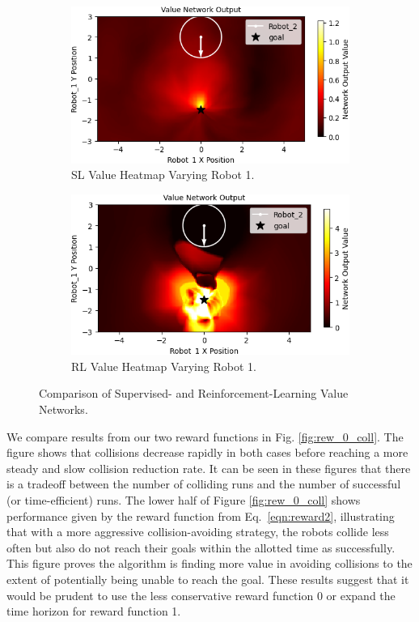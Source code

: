 \documentclass[conference]{IEEEtran}
\begin{document}
\begin{figure}[t!]
    \centering
    \begin{subfigure}[b]{0.49\textwidth}
         \centering
         \includegraphics[width=\textwidth]{docs/latex/figures/heatmap_1_Robot_1.png}
         \caption{SL Value Heatmap Varying Robot 1.}
         \label{fig:heatmap_21}
     \end{subfigure}
     \hfill
     \begin{subfigure}[b]{0.49\textwidth}
         \centering
         \includegraphics[width=\textwidth]{docs/latex/figures/heatmap_rl_robot1.png}
         \caption{RL Value Heatmap Varying Robot 1.}
         \label{fig:heatmap_22}
     \end{subfigure}
     \caption{Comparison of Supervised- and Reinforcement-Learning Value Networks.}\label{fig:heatmap_2}
\end{figure}

We compare results from our two reward functions in Fig. \ref{fig:rew_0_coll}. The figure shows that collisions decrease rapidly in both cases before reaching a more steady and slow collision reduction rate. It can be seen in these figures that there is a tradeoff between the number of colliding runs and the number of successful (or time-efficient) runs. The lower half of Figure \ref{fig:rew_0_coll} shows performance given by the reward function from Eq.~\ref{eqn:reward2}, illustrating that with a more aggressive collision-avoiding strategy, the robots collide less often but also do not reach their goals within the allotted time as successfully. This figure proves the algorithm is finding more value in avoiding collisions to the extent of potentially being unable to reach the goal. These results suggest that it would be prudent to use the less conservative reward function 0 or expand the time horizon for reward function 1.
\end{document}
